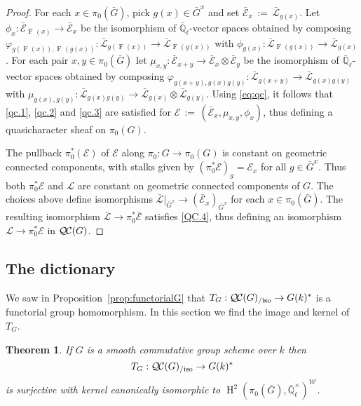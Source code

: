\documentclass[10pt]{amsart}
\theoremstyle{plain}
\newtheorem{theorem}{Theorem}[section]
\theoremstyle{definition}
\theoremstyle{remark}
\newcommand{\EE}{\mathbb{\bar Q}_\ell}
\newcommand{\Fq}{k}
\newcommand{\EEx}{\EE^\times}
\newcommand{\Weil}[1]{\mathcal{W}_{#1}}
\newcommand{\Frob}[1]{\operatorname{F}_{#1}}
\DeclareMathOperator{\Hh}{H}
\newcommand{\ceq}{{\, :=\, }}
\newcommand{\TrFrob}[1]{T_{#1}}
\newcommand{\qcs}[1]{{\mathcal{#1}}}
\newcommand{\gqcs}[1]{{\mathcal{\bar #1}}}
\newcommand{\QC}{{\mathcal{Q\hskip-0.8pt C}}}
\newcommand{\QCiso}[1]{\QC(#1)_{/\text{iso}}}
\newcommand{\bG}{\bar{G}}
\begin{document}
\begin{proof}
For each $x\in \pi_0(\bG)$, pick $g(x)\in \bG^x$
and set $\gqcs{E}_x \ceq \gqcs{L}_{g(x)}$.
Let $\phi_x : \gqcs{E}_{\Frob{}(x)} \to \gqcs{E}_x$
be the isomorphism of $\EE$-vector spaces obtained by composing
$\varphi_{g(\Frob{}(x)),\Frob{}(g(x))} : \gqcs{L}_{g(\Frob{}(x))} \to \gqcs{L}_{\Frob{}(g(x))}$
with $\phi_{g(x)} : \gqcs{L}_{\Frob{}(g(x))} \to \gqcs{L}_{g(x)}$.
For each pair $x,y\in \pi_0(\bG)$
let $\mu_{x,y} : \gqcs{E}_{x+y}\to \gqcs{E}_x\otimes \gqcs{E}_y$
be the isomorphism of $\EE$-vector spaces obtained by composing
$\varphi_{g(x+y),g(x)g(y)} : \gqcs{L}_{g(x+y)} \to \gqcs{L}_{g(x)g(y)}$
with $\mu_{g(x),g(y)} : \gqcs{L}_{g(x)g(y)} \to \gqcs{L}_{g(x)}\otimes \gqcs{L}_{g(y)}$.
Using \eqref{eq:qc}, it follows that \ref{qc.1}, \ref{qc.2} and \ref{qc.3} are satisfied for
$\qcs{E} \ceq (\gqcs{E}_x, \mu_{x,y}, \phi_x)$, thus defining a quasicharacter sheaf on $\pi_0(G)$.

The pullback $\pi_0^*(\qcs{E})$ of $\qcs{E}$ along $\pi_0 : G \to \pi_0(G)$ is constant
on geometric connected components, with stalks given by
$(\pi_0^* \qcs{E})_g = \qcs{E}_{x}$ for all $g\in \bG^x$.  Thus both $\pi_0^*\qcs{E}$ and $\qcs{L}$
are constant on geometric connected components of $G$.
The choices above define isomorphisms
$\gqcs{L}\vert_{\bG^x} \to  (\gqcs{E}_{x})_{\bG^x}$ for each $x\in \pi_0(\bG)$.
The resulting isomorphism $\gqcs{L} \to \pi_0^* \gqcs{E}$ satisfies \ref{QC.4},
thus defining an isomorphism $\qcs{L} \to \pi_0^* \qcs{E}$ in $\QC(G)$.
\end{proof}

\subsection{The dictionary}
\label{ssec:snake}

We saw in Proposition~\ref{prop:functorialG} that $\TrFrob{G} : \QCiso{G} \to G(\Fq)^*$ is a functorial group homomorphism.
In this section we find the image and kernel of $\TrFrob{G}$.

\begin{theorem}\label{thm:snake}
  If $G$ is a smooth commutative group scheme over $\Fq$ then
  \[
  \TrFrob{G} : \QCiso{G} \to G(\Fq)^*
  \]
is surjective with kernel canonically isomorphic to $\Hh^2(\pi_0({\bar G}),\EEx)^{\Weil{}}$.
\end{theorem}
\end{document}
